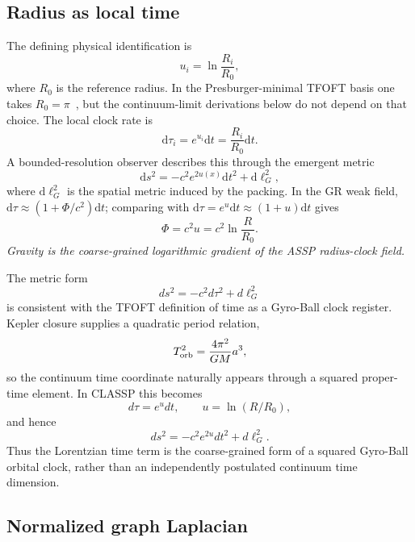 \documentclass[11pt,a4paper]{article}
\newcommand{\dd}{\mathrm{d}}
\begin{document}
\subsection{Radius as local time}

The defining physical identification is
\begin{equation}
  u_i=\ln\frac{R_i}{R_0},
  \label{eq:u_def}
\end{equation}
where $R_0$ is the reference radius. In the Presburger-minimal TFOFT basis one
takes $R_0=\pi$~\cite{TFOFT2026}, but the continuum-limit derivations below do
not depend on that choice. The local clock rate is
\begin{equation}
  \dd\tau_i=e^{u_i}\dd t=\frac{R_i}{R_0}\dd t.
  \label{eq:clock}
\end{equation}
A bounded-resolution observer describes this through the emergent metric
\begin{equation}
  \dd s^2=-c^2e^{2u(x)}\dd t^2+\dd\ell_G^2,
  \label{eq:metric}
\end{equation}
where $\dd\ell_G^2$ is the spatial metric induced by the packing. In the GR
weak field, $\dd\tau\approx(1+\Phi/c^2)\dd t$; comparing with
$\dd\tau=e^u\dd t\approx(1+u)\dd t$ gives
\begin{equation}
  \Phi=c^2u=c^2\ln\frac{R}{R_0}.
  \label{eq:phi_u}
\end{equation}
\emph{Gravity is the coarse-grained logarithmic gradient of the ASSP
radius-clock field.}

The metric form
\[
  ds^2=-c^2d\tau^2+d\ell_G^2
\]
is consistent with the TFOFT definition of time as a Gyro-Ball clock register.
Kepler closure supplies a quadratic period relation,
\[
  T_{\rm orb}^2=\frac{4\pi^2}{GM}a^3,
\]
so the continuum time coordinate naturally appears through a squared proper-time
element. In CLASSP this becomes
\[
  d\tau=e^u dt,\qquad
  u=\ln(R/R_0),
\]
and hence
\[
  ds^2=-c^2e^{2u}dt^2+d\ell_G^2.
\]
Thus the Lorentzian time term is the coarse-grained form of a squared
Gyro-Ball orbital clock, rather than an independently postulated continuum
time dimension.


\subsection{Normalized graph Laplacian}
\end{document}
